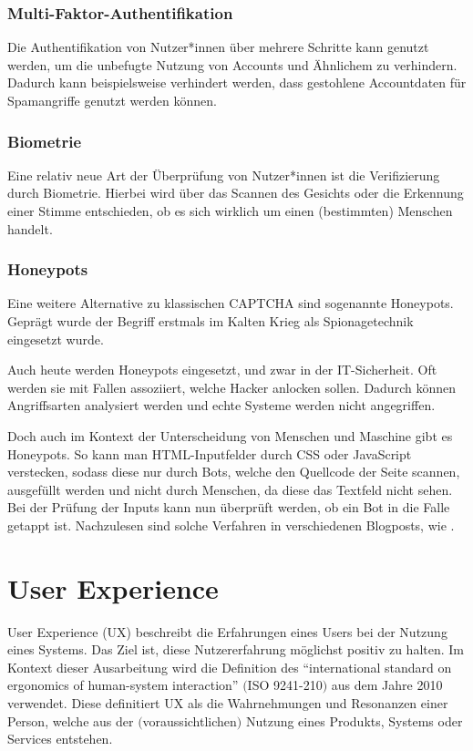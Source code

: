 \subsubsection*{Multi-Faktor-Authentifikation}
Die Authentifikation von Nutzer*innen über mehrere Schritte kann genutzt werden, um die unbefugte Nutzung von Accounts und Ähnlichem zu verhindern.
Dadurch kann beispielsweise verhindert werden, dass gestohlene Accountdaten für Spamangriffe genutzt werden können.
\subsubsection*{Biometrie}
Eine relativ neue Art der Überprüfung von Nutzer*innen ist die Verifizierung durch Biometrie.
Hierbei wird über das Scannen des Gesichts oder die Erkennung einer Stimme entschieden, ob es sich wirklich um einen (bestimmten) Menschen handelt.
\cite{rtcaptcha}
\subsubsection*{Honeypots}
Eine weitere Alternative zu klassischen CAPTCHA sind sogenannte Honeypots. 
Geprägt wurde der Begriff erstmals im Kalten Krieg als Spionagetechnik eingesetzt wurde. \cite[p.2]{joshi:2011} 

Auch heute werden Honeypots eingesetzt, und zwar in der IT-Sicherheit. 
Oft werden sie mit Fallen assoziiert, welche Hacker anlocken sollen. 
Dadurch können Angriffsarten analysiert werden und echte Systeme werden nicht angegriffen.

Doch auch im Kontext der Unterscheidung von Menschen und Maschine gibt es Honeypots. 
So kann man HTML-Inputfelder durch CSS oder JavaScript verstecken, sodass diese nur durch Bots, welche den Quellcode der Seite scannen, ausgefüllt werden 
und nicht durch Menschen, da diese das Textfeld nicht sehen. 
Bei der Prüfung der Inputs kann nun überprüft werden, ob ein Bot in die Falle getappt ist. 
Nachzulesen sind solche Verfahren in verschiedenen Blogposts, wie \cite{perry:2019}.

\section{User Experience}

User Experience (UX) beschreibt die Erfahrungen eines Users bei der Nutzung eines Systems. 
Das Ziel ist, diese Nutzererfahrung möglichst positiv zu halten. 
Im Kontext dieser Ausarbeitung wird die Definition des  ``international standard on ergonomics of human-system interaction'' $($ISO 9241-210$)$
aus dem Jahre 2010 verwendet. 
Diese definitiert UX als die Wahrnehmungen und Resonanzen einer Person, 
welche aus der $($voraussichtlichen$)$ Nutzung eines Produkts, Systems oder Services entstehen. \cite[p.1629]{berni_borgianni_2021}

